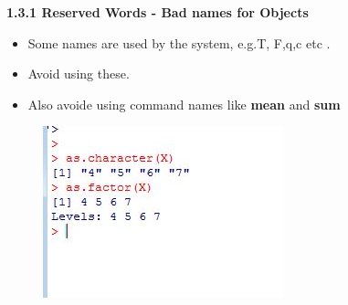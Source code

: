 \documentclass{beamer}
\begin{document}
 	\begin{frame}
 		
 		\textbf{1.3.1 Reserved Words - Bad names for Objects}
 		\begin{itemize}
 			\item Some names are used by the system, e.g.T, F,q,c etc . 
 			\item Avoid using these.
 			\item Also avoide using command names like \textbf{mean} and \textbf{sum}
 		\end{itemize}
 	\end{frame}
 	\begin{frame}
 		\begin{figure}
 			\centering
 			\includegraphics[width=1.2\linewidth]{images/typeconversion} 
 		\end{figure}
 	\end{frame}   
 	
 	
 	
\end{document}
